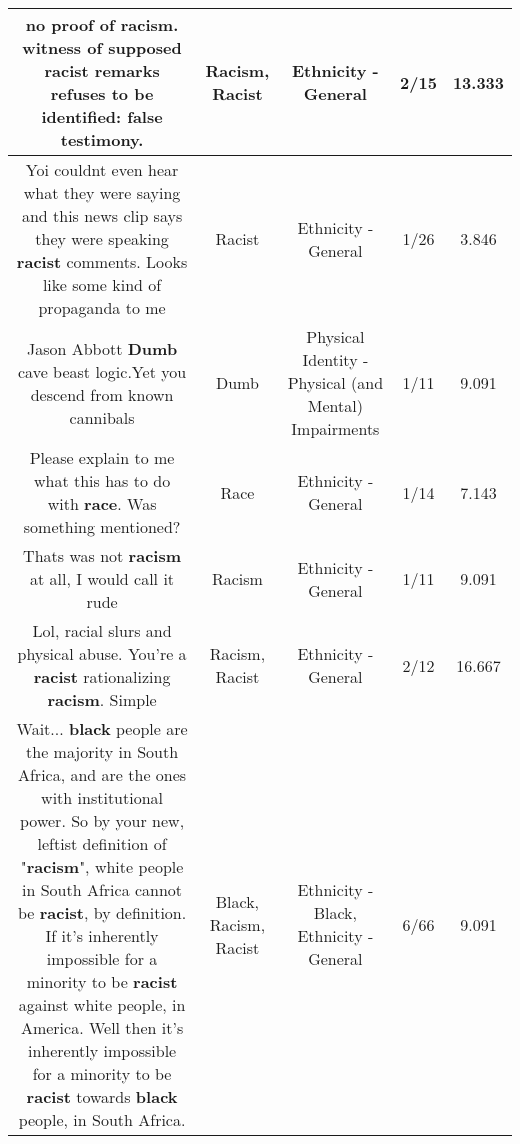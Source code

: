 \documentclass[11pt]{article}
\newlength\mylength
\begin{document}
\begin{center}
\begin{longtable}{|C{.65\mylength}|C{.30\mylength}|C{.12\mylength}|C{.12\mylength}|C{.12\mylength}|}
  \small no proof of \textbf{racism}. witness of supposed \textbf{racist} remarks refuses to be identified: false testimony.\normalsize   & Racism, Racist & Ethnicity - General & 2/15 & 13.333 \\  \hline
  \small Yoi couldnt even hear what they were saying and this news clip says they were speaking \textbf{racist} comments. Looks like some kind of propaganda to me\normalsize   & Racist & Ethnicity - General & 1/26 & 3.846 \\  \hline
  \small Jason Abbott \textbf{Dumb} cave beast logic.Yet you descend from known cannibals\normalsize   & Dumb & Physical Identity - Physical (and Mental) Impairments & 1/11 & 9.091 \\  \hline
  \small Please explain to me what this has to do with \textbf{race}. Was something mentioned?\normalsize   & Race & Ethnicity - General & 1/14 & 7.143 \\  \hline
  \small Thats was not \textbf{racism} at all, I would call it rude\normalsize   & Racism & Ethnicity - General & 1/11 & 9.091 \\  \hline
  \small Lol, racial slurs and physical abuse. You're a \textbf{racist} rationalizing \textbf{racism}. Simple\normalsize   & Racism, Racist & Ethnicity - General & 2/12 & 16.667 \\  \hline
  \small Wait... \textbf{black} people are the majority in South Africa, and are the ones with institutional power. So by your new, leftist definition of "\textbf{racism}", white people in South Africa cannot be \textbf{racist}, by definition. If it's inherently impossible for a minority to be \textbf{racist} against white people, in America. Well then it's inherently impossible for a minority to be \textbf{racist} towards \textbf{black} people, in South Africa.\normalsize   & Black, Racism, Racist & Ethnicity - Black, Ethnicity - General & 6/66 & 9.091 \\  \hline

\end{longtable}
\end{center}
\end{document}
